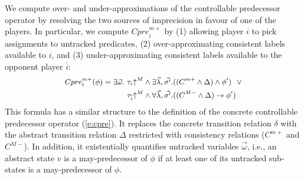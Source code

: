 \documentclass{book}
\newcommand{\abstractM}[1]{#1\mathord{\uparrow^M}}
\newcommand{\vect}[1]{\vec{#1}}
\theoremstyle{definition}
\begin{document}
We compute over- and under-approximations of the controllable 
predecessor operator by resolving the two sources of imprecision 
in favour of one of the players.  In particular, we compute 
$Cpre_i^{m+}$ by (1) allowing player $i$ to pick assignments to 
untracked predicates, (2) over-approximating consistent labels 
available to $i$, and (3) under-approximating consistent labels 
available to the opponent player $\overline{i}$:
\begin{equation}
    \label{e:cprem}
    \small
\begin{aligned}
    Cpre_i^{m+}(\phi) = \exists \vect{\omega} .~&\abstractM{\tau_i}         \land \exists \vect{\lambda},\vect{\sigma'}. ((C^{m+} \land \Delta) \land \phi')
                                                 ~~\lor\\
                                                &\abstractM{\tau_{\overline{i}}} \land \forall \vect{\lambda},\vect{\sigma'}. ((C^{M-} \land\Delta) \rightarrow \phi')
\end{aligned}
\end{equation}
This formula has a similar structure to the definition of the 
concrete controllable predecessor operator (\ref{e:cpre}).  It 
replaces the concrete transition relation $\delta$ with the 
abstract transition relation $\Delta$ restricted with consistency 
relations ($C^{m+}$ and $C^{M-}$).  In addition, it existentially 
quantifies untracked variables $\vect{\omega}$, i.e., an abstract 
state $v$ is a may-predecessor of $\phi$ if at least one of its 
untracked sub-states is a may-predecessor of $\phi$.
\end{document}
